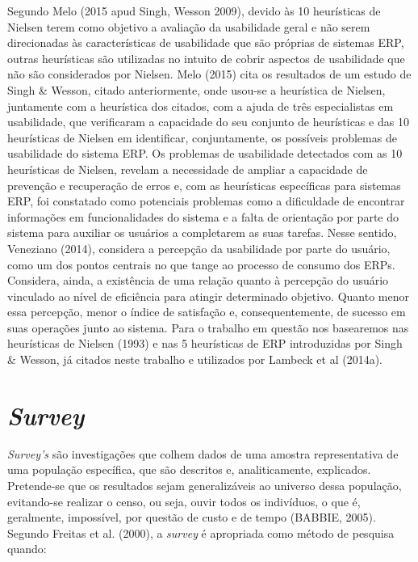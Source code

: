 Segundo Melo (2015 apud Singh, Wesson 2009), devido às 10 heurísticas de Nielsen terem como objetivo a avaliação da usabilidade geral e não serem direcionadas às características de usabilidade que são próprias de sistemas ERP, outras heurísticas são utilizadas no intuito de cobrir aspectos de usabilidade que não são considerados por Nielsen.\newline
\indent Melo (2015) cita os resultados de um estudo de Singh \& Wesson, citado anteriormente, onde usou-se a heurística de Nielsen, juntamente com a heurística dos citados, com a ajuda de três especialistas em usabilidade, que verificaram a capacidade do seu conjunto de heurísticas e das 10 heurísticas de Nielsen em identificar, conjuntamente, os possíveis problemas de usabilidade do sistema ERP.\newline
\indent Os problemas de usabilidade detectados com as 10 heurísticas de Nielsen, revelam a necessidade de ampliar a capacidade de prevenção e recuperação de erros e, com as heurísticas específicas para sistemas ERP, foi constatado como potenciais problemas como a dificuldade de encontrar informações em funcionalidades do sistema e a falta de orientação por parte do sistema para auxiliar os usuários a completarem as suas tarefas.\newline
\indent Nesse sentido, Veneziano (2014), considera a percepção da usabilidade por parte do usuário, como um dos pontos centrais no que tange ao processo de consumo dos ERPs. Considera, ainda, a existência de uma relação quanto à percepção do usuário vinculado ao nível de eficiência para atingir determinado objetivo. Quanto menor essa percepção, menor o índice de satisfação e, consequentemente, de sucesso em suas operações junto ao sistema.\newline
\indent Para o trabalho em questão nos basearemos nas heurísticas de Nielsen (1993) e nas 5 heurísticas de ERP introduzidas por Singh \& Wesson, já citados neste trabalho e utilizados por Lambeck et al (2014a). 

\section{\textit{Survey}} \label{Survey}

\textit{Survey's} são investigações que colhem dados de uma amostra representativa de uma população específica, que são descritos e, analiticamente, explicados. Pretende-se que os resultados sejam generalizáveis ao universo dessa população, evitando-se realizar o censo, ou seja, ouvir todos os indivíduos, o que é, geralmente, impossível, por questão de custo e de tempo (BABBIE, 2005).\newline
\indent Segundo Freitas et al. (2000), a \textit{survey} é apropriada como método de pesquisa quando:

